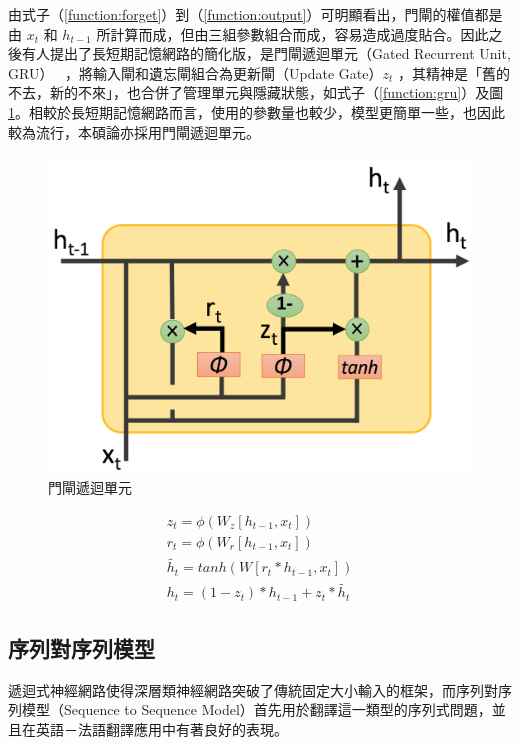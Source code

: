 由式子（\ref{function:forget}）到（\ref{function:output}）可明顯看出，門閘的權值都是由 $x_t$ 和 $h_{t-1}$ 所計算而成，但由三組參數組合而成，容易造成過度貼合。因此之後有人提出了長短期記憶網路的簡化版，是門閘遞迴單元（Gated Recurrent Unit, GRU）~\cite{cho2014learning} ，將輸入閘和遺忘閘組合為更新閘（Update Gate）$z_t$ ，其精神是「舊的不去，新的不來」，也合併了管理單元與隱藏狀態，如式子（\ref{function:gru}）及圖 \ref{fig:gru}。相較於長短期記憶網路而言，使用的參數量也較少，模型更簡單一些，也因此較為流行，本碩論亦採用門閘遞迴單元。
\begin{figure}[h]
    \centering
    \includegraphics[scale=0.35]{images/chap2_gru.png}
    \caption{門閘遞迴單元}\label{fig:gru}
\end{figure}
\begin{equation}
    \label{function:gru}
    \begin{aligned}
        z_t = \phi(W_z [h_{t-1},x_t]) \\
        r_t = \phi(W_r [h_{t-1},x_t]) \\
        \tilde{h_t} = tanh(W[r_t*h_{t-1},x_t]) \\
        h_t = (1-z_t) * h_{t-1} + z_t * \tilde{h_t}
\end{aligned}
\end{equation}
\subsection{序列對序列模型}
遞迴式神經網路使得深層類神經網路突破了傳統固定大小輸入的框架，而序列對序列模型（Sequence to Sequence Model）首先用於翻譯這一類型的序列式問題，並且在英語－法語翻譯應用中有著良好的表現。

